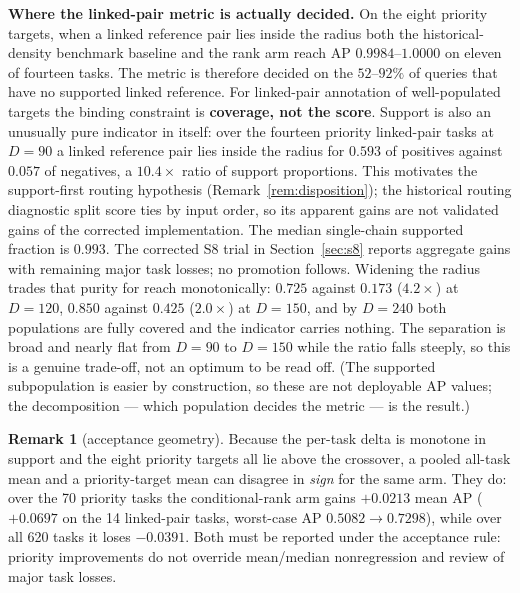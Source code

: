 \documentclass[10pt,a4paper]{article}
\theoremstyle{definition}
\newtheorem{remark}{Remark}
\begin{document}
\textbf{Where the linked-pair metric is actually decided.} On the eight priority targets, when a
linked reference pair lies inside the radius both the historical-density benchmark baseline and the rank arm reach AP
$0.9984$--$1.0000$ on eleven of fourteen tasks. The metric is therefore decided on the $52$--$92\%$
of queries that have no supported linked reference. For linked-pair annotation of well-populated
targets the binding constraint is \textbf{coverage, not the score}. Support is also an unusually
pure indicator in itself: over the fourteen priority linked-pair tasks at $D=90$ a linked reference
pair lies inside the radius for $0.593$ of positives against $0.057$ of negatives, a $10.4\times$
ratio of support proportions. This motivates the support-first routing hypothesis
(Remark~\ref{rem:disposition}); the historical routing diagnostic split score ties by input order,
so its apparent gains are not validated gains of the corrected implementation. The median
single-chain supported fraction is $0.993$. The corrected S8 trial in Section~\ref{sec:s8} reports aggregate gains with remaining major task losses; no promotion follows. Widening the radius trades that purity for reach monotonically: $0.725$ against $0.173$
($4.2\times$) at $D=120$, $0.850$ against $0.425$ ($2.0\times$) at $D=150$, and by $D=240$ both
populations are fully covered and the indicator carries nothing. The separation is broad and nearly
flat from $D=90$ to $D=150$ while the ratio falls steeply, so this is a genuine trade-off, not an
optimum to be read off. (The supported subpopulation is
easier by construction, so these are not deployable AP values; the decomposition --- which
population decides the metric --- is the result.)

\begin{remark}[acceptance geometry]
Because the per-task delta is monotone in support and the eight priority targets all lie above the
crossover, a pooled all-task mean and a priority-target mean can disagree in \emph{sign} for the
same arm. They do: over the 70 priority tasks the conditional-rank arm gains $+0.0213$ mean AP
($+0.0697$ on the 14 linked-pair tasks, worst-case AP $0.5082\to0.7298$), while over all 620 tasks
it loses $-0.0391$. Both must be reported under the acceptance rule: priority improvements do not override
mean/median nonregression and review of major task losses.
\end{remark}
\end{document}
